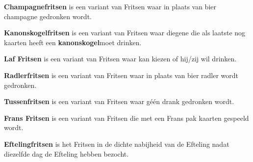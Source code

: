 
\newpage
\drawBar{}

\item \textbf{Champagnefritsen} is een variant van Fritsen waar in plaats van bier champagne gedronken wordt.

\item \textbf{Kanonskogelfritsen} is een variant van Fritsen waar diegene die als laatste nog kaarten heeft een \textbf{kanonskogel}\footnotemark[1] moet drinken. 

\item \textbf{Laf Fritsen} is een variant van Fritsen waar \eenSpeler kan kiezen of hij/zij wil drinken.

\item \textbf{Radlerfritsen} is een variant van Fritsen waar in plaats van bier radler wordt gedronken.

\item \textbf{Tussenfritsen} is een variant van Fritsen waar g\'e\'en drank gedronken wordt.

\item \textbf{Frans Fritsen} is een variant van Fritsen die met een Frans pak kaarten gespeeld wordt.

\item \textbf{Eftelingfritsen} is het Fritsen in de dichte nabijheid van de Efteling nadat \alleSpelers diezelfde dag de Efteling hebben bezocht.
\eindABCLijst


